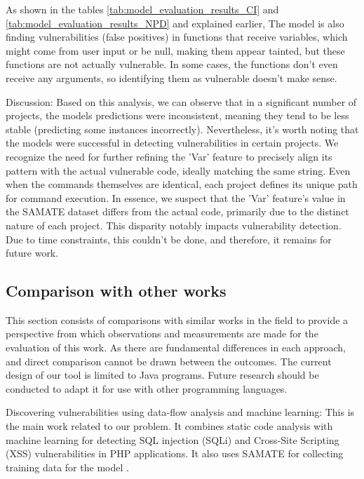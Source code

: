 \documentclass[journal,a4paper]{IEEEtran}
\begin{document}
As shown in the tables \ref{tab:model_evaluation_results_CI} and \ref{tab:model_evaluation_results_NPD} and explained earlier, The model is also finding vulnerabilities (false positives) in functions that receive variables, which might come from user input or be null, making them appear tainted, but these functions are not actually vulnerable. In some cases, the functions don't even receive any arguments, so identifying them as vulnerable doesn't make sense.

Discussion: Based on this analysis, we can observe that in a significant number of projects, the models predictions were inconsistent, meaning they tend to be less stable (predicting some instances incorrectly). Nevertheless, it's worth noting that the models were successful in detecting vulnerabilities in certain projects. We recognize the need for further refining the 'Var' feature to precisely align its pattern with the actual vulnerable code, ideally matching the same string. Even when the commands themselves are identical, each project defines its unique path for command execution. In essence, we suspect that the 'Var' feature's value in the SAMATE dataset differs from the actual code, primarily due to the distinct nature of each project. This disparity notably impacts vulnerability detection. Due to time constraints, this couldn't be done, and therefore, it remains for future work.

\subsection{Comparison with other works}

This section consists of comparisons with similar works in the field to provide a perspective from which observations and measurements are made for the evaluation of this work. As there are fundamental differences in each approach, and direct comparison cannot be drawn between the outcomes. The current design of our tool is limited to Java programs. Future research should be conducted to adapt it for use with other programming languages.

Discovering vulnerabilities using data-flow analysis and machine learning: This is the main work related to our problem. It combines static code analysis with machine learning for detecting SQL injection (SQLi) and Cross-Site Scripting (XSS) vulnerabilities in PHP applications. It also uses SAMATE for collecting training data for the model \cite{Kronjee2018}.
\end{document}
